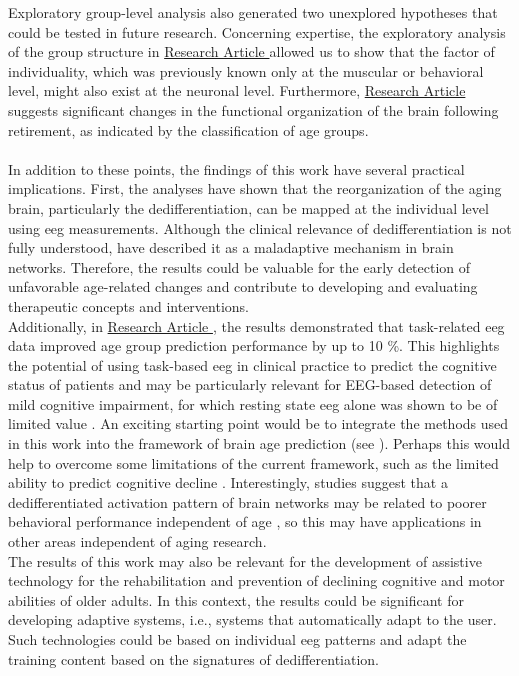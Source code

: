Exploratory group-level analysis also generated two unexplored hypotheses that could be tested in future research. Concerning expertise, the exploratory analysis of the group structure in \hyperref[results:paperIII]{Research Article } allowed us to show that the factor of individuality, which was previously known only at the muscular or behavioral level, might also exist at the neuronal level. Furthermore, \hyperref[results:paperII]{Research Article } suggests significant changes in the functional organization of the brain following retirement, as indicated by the classification of age groups.\\
\\
In addition to these points, the findings of this work have several practical implications. First, the analyses have shown that the reorganization of the aging brain, particularly the dedifferentiation, can be mapped at the individual level using \gls{eeg} measurements. Although the clinical relevance of dedifferentiation is not fully understood, \citeauthor{Fornito2015} \cite{Fornito2015} have described it as a maladaptive mechanism in brain networks. Therefore, the results could be valuable for the early detection of unfavorable age-related changes and contribute to developing and evaluating therapeutic concepts and interventions.\\
Additionally, in \hyperref[results:paperII]{Research Article }, the results demonstrated that task-related \gls{eeg} data improved age group prediction performance by up to 10 \%. This highlights the potential of using task-based \gls{eeg} in clinical practice to predict the cognitive status of patients and may be particularly relevant for EEG-based detection of mild cognitive impairment, for which resting state \gls{eeg} alone was shown to be of limited value \cite{Froehlich2021, Farina2020}. An exciting starting point would be to integrate the methods used in this work into the framework of brain age prediction (see ). Perhaps this would help to overcome some limitations of the current framework, such as the limited ability to predict cognitive decline \cite{Tetereva2023}. Interestingly, studies suggest that a dedifferentiated activation pattern of brain networks may be related to poorer behavioral performance independent of age \cite{Koen2019}, so this may have applications in other areas independent of aging research.\\
The results of this work may also be relevant for the development of assistive technology for the rehabilitation and prevention of declining cognitive and motor abilities of older adults. In this context, the results could be significant for developing adaptive systems, i.e., systems that automatically adapt to the user. Such technologies could be based on individual \gls{eeg} patterns and adapt the training content based on the signatures of dedifferentiation.\\
